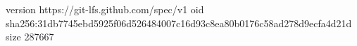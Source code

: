 version https://git-lfs.github.com/spec/v1
oid sha256:31db7745ebd5925f06d526484007c16d93c8ea80b0176c58ad278d9ecfa4d21d
size 287667
